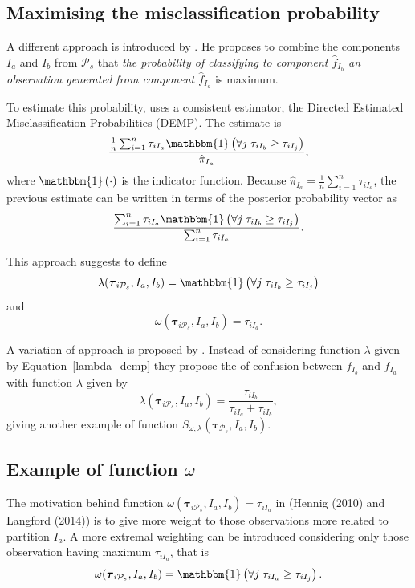 \documentclass[10pt, a4paper]{article}
\newcommand{\m}[1]{\boldsymbol{#1}}
\begin{document}
\begin{spacing}{1.9}
\subsection{Maximising the misclassification probability}
\label{missclassification_section}

A different approach is introduced by \cite{hennig2010methods}. He proposes to combine the components $I_a$ and $I_b$ from $ \mathcal{P}_s$ that \emph{the probability of classifying to component $\hat{f}_{I_b}$ an observation generated from component $\hat{f}_{I_a}$ } is maximum.

To estimate this probability,  \cite{hennig2010methods} uses a consistent estimator, the Directed Estimated Misclassification Probabilities (DEMP). The estimate is
\[
\frac{ \frac{1}{n} \sum_{i=1}^n {\tau_{iI_a} \mathbbm{1}\left( \forall j\; \tau_{i I_{b}} \geq \tau_{iI_j} \right)}}{ \hat{\pi}_{I_a}},
\]
where $\mathbbm{1}\left( \cdot \right)$ is the indicator function. Because $ \hat{\pi}_{I_a} = \frac{1}{n} \sum_{i=1}^n \tau_{iI_a}$, the previous estimate can be written in terms of the posterior probability vector as
\begin{equation}\label{demp_criteria}
\frac{ \sum_{i=1}^n {\tau_{iI_a} \mathbbm{1}\left( \forall j\; \tau_{i I_{b}} \geq \tau_{iI_j} \right)}}{\sum_{i=1}^n \tau_{iI_a} }.
\end{equation}

This approach suggests to define
\begin{equation}\label{lambda_demp}
\lambda(\m\tau_{i \mathcal{P}_s},  I_a,  I_b) = \mathbbm{1}\left( \forall j\; \tau_{i I_{b}} \geq \tau_{iI_j} \right)
\end{equation}
and
\[
\omega(\m\tau_{i \mathcal{P}_s},  I_a,  I_b) =  \tau_{iI_a}.
\]

A variation of \cite{hennig2010methods} approach is proposed by \cite{longford2014}. Instead of considering function $\lambda$ given by Equation~\ref{lambda_demp} they propose the of confusion between $f_{I_b}$ and $f_{I_a}$ with function $\lambda$ given by
\[
\lambda(\m\tau_{i \mathcal{P}_s},  I_a,  I_b) = \frac{\tau_{iI_b}}{\tau_{iI_a} + \tau_{iI_b}},
\]
giving another example of function $S_{\omega, \lambda}( \m\tau_{\mathcal{P}_s},  I_a,  I_b)$.


\subsection{Example of function $\omega$}

The motivation behind function $\omega(\m\tau_{i \mathcal{P}_s},  I_a,  I_b) = \tau_{iI_a}$ in (Hennig (2010) and Langford (2014)) is to give more weight to those observations more related to partition $I_a$. A more extremal weighting can be introduced considering only those observation having maximum $ \tau_{iI_a}$, that is
\[
\omega(\m\tau_{i \mathcal{P}_s},  I_a,  I_b) = \mathbbm{1}\left( \forall j\; \tau_{i I_{a}} \geq \tau_{iI_j} \right).
\]


\end{spacing}
\end{document}
